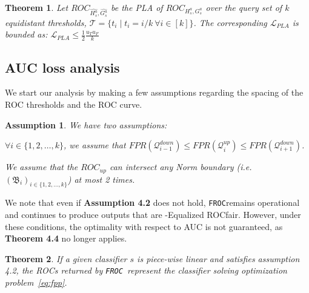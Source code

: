 \documentclass{article}
\newtheorem{theorem}{Theorem}[section]
\newtheorem{assumption}{Assumption}[section]
\newcommand{\ouralgo}{\texttt{FROC}}
\newcommand{\ourdef}{-Equalized ROC}
\begin{document}

\begin{theorem} \label{th:pla}
Let $ROC_{\widehat{H_s^a}, \widehat{G_s^a}}$ be the \emph{PLA} of $ROC_{H_s^a,G_s^a}$ over the query set of $k$ equidistant thresholds, $\mathcal{T} = \{ t_i \mid t_i = i/k \ \forall i \in [k] \}$. The corresponding $\mathcal{L}_{PLA}$ is bounded as:
    $\mathcal{L}_{PLA} \le\frac{1}{2} \frac{u_Tu_F}{k}$
\end{theorem}


\subsection{AUC loss analysis}
We start our analysis by making a few assumptions regarding the spacing of the ROC thresholds and the ROC curve.
\begin{assumption} \label{assumption2}
We have two assumptions:
\begin{compactitem}
    \item $\forall i\in \{1 ,2 , \hdots , k\}$, we assume that $FPR(\mathcal{Q}_{i-1}^{down}) \le FPR(\mathcal{Q}_i^{up}) \le FPR(\mathcal{Q}_{i+1}^{down})$.
    \item We assume that the $ROC_{up}$ can intersect any Norm boundary (i.e. $(\mathfrak{B}_i)_{i\in \{1 ,2 , \hdots , k\}}$) at most 2 times.
\end{compactitem}
\end{assumption}
We note that even if \textbf{Assumption 4.2} does not hold, \ouralgo remains operational and continues to produce outputs that are \ourdef fair. However, under these conditions, the optimality with respect to AUC is not guaranteed, as \textbf{Theorem 4.4} no longer applies.


\begin{theorem}
\label{thm:}If a given classifier $s$ is piece-wise linear and satisfies assumption 4.2, the ROCs returned by \ouralgo\ represent the classifier solving optimization problem~\ref{eq:fpp}.
\end{theorem}
\end{document}
